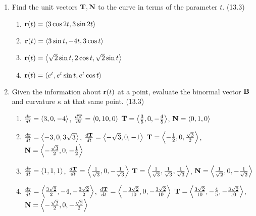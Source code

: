 \begin{enumerate}
    \item Find the unit vectors $\mathbf{T},\mathbf{N}$ to the curve in terms of the parameter $t$. (13.3)

      \begin{enumerate}
        \item $\mathbf{r}(t) = \left<3\cos2t,3\sin2t \right>$
        \item $\mathbf{r}(t) = \left< 3\sin t, -4t, 3\cos t \right>$
        \item $\mathbf{r}(t) = \left< \sqrt{2}\sin t,2\cos t,\sqrt{2}\sin t \right>$
        \item $\mathbf{r}(t) = \left<e^t, e^t\sin t, e^t\cos t\right>$
      \end{enumerate}

    \newpage

    \item Given the information about $\mathbf{r}(t)$ at a point, evaluate the binormal vector $\mathbf{B}$ and curvature $\kappa$ at that same point. (13.3)

      \begin{enumerate}
        \item $\frac{d\mathbf{r}}{dt}=\left<3,0,-4\right>$, 
              $\frac{d\mathbf{T}}{dt}=\left<0,10,0\right>$ \newline
              $\mathbf{T}=\left<\frac{3}{5},0,-\frac{4}{5}\right>$, 
              $\mathbf{N}=\left<0,1,0\right>$
        \item $\frac{d\mathbf{r}}{dt}=\left<-3,0,3\sqrt{3}\right>$, 
              $\frac{d\mathbf{T}}{dt}=\left<-\sqrt{3},0,-1\right>$ \newline
              $\mathbf{T}=\left<-\frac{1}{2},0,\frac{\sqrt{3}}{2}\right>$, 
              $\mathbf{N}=\left<-\frac{\sqrt{3}}{2},0,-\frac{1}{2}\right>$
        \item $\frac{d\mathbf{r}}{dt}=\left<1,1,1\right>$, 
              $\frac{d\mathbf{T}}{dt}=\left<\frac{1}{\sqrt{3}},0,-\frac{1}{\sqrt{3}}\right>$ \newline
              $\mathbf{T}=\left<\frac{1}{\sqrt{3}},\frac{1}{\sqrt{3}},\frac{1}{\sqrt{3}}\right>$, 
              $\mathbf{N}=\left<\frac{1}{\sqrt{2}},0,-\frac{1}{\sqrt{2}}\right>$
        \item $\frac{d\mathbf{r}}{dt}=\left< \frac{3\sqrt{2}}{2}, -4, -\frac{3\sqrt{2}}{2}\right>$, 
              $\frac{d\mathbf{T}}{dt}=\left<-\frac{3\sqrt{2}}{10},0,-\frac{3\sqrt{2}}{10}\right>$\newline
              $\mathbf{T}=\left< \frac{3\sqrt{2}}{10}, -\frac{4}{5}, -\frac{3\sqrt{2}}{10}\right>$, 
              $\mathbf{N}=\left<-\frac{\sqrt{2}}{2},0,-\frac{\sqrt{2}}{2}\right>$
      \end{enumerate}


\end{enumerate}
